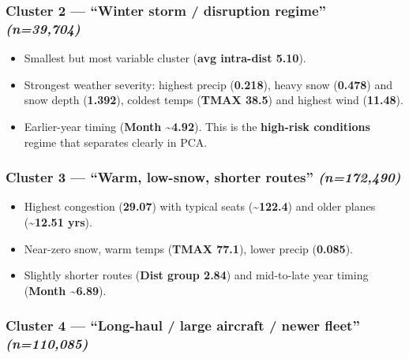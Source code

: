 \documentclass[11pt]{article}
\providecommand{\tightlist}{%
      \setlength{\itemsep}{0pt}\setlength{\parskip}{0pt}}
\begin{document}
\subsubsection{\texorpdfstring{Cluster 2 --- ``Winter storm / disruption
regime''
\emph{(n=39,704)}}{Cluster 2 --- ``Winter storm / disruption regime'' (n=39,704)}}\label{cluster-2-winter-storm-disruption-regime-n39704}

\begin{itemize}
\tightlist
\item
  Smallest but most variable cluster (\textbf{avg intra-dist 5.10}).
\item
  Strongest weather severity: highest precip (\textbf{0.218}), heavy
  snow (\textbf{0.478}) and snow depth (\textbf{1.392}), coldest temps
  (\textbf{TMAX 38.5}) and highest wind (\textbf{11.48}).
\item
  Earlier-year timing (\textbf{Month \textasciitilde4.92}). This is the
  \textbf{high-risk conditions} regime that separates clearly in PCA.
\end{itemize}

\subsubsection{\texorpdfstring{Cluster 3 --- ``Warm, low-snow, shorter
routes''
\emph{(n=172,490)}}{Cluster 3 --- ``Warm, low-snow, shorter routes'' (n=172,490)}}\label{cluster-3-warm-low-snow-shorter-routes-n172490}

\begin{itemize}
\tightlist
\item
  Highest congestion (\textbf{29.07}) with typical seats
  (\textbf{\textasciitilde122.4}) and older planes
  (\textbf{\textasciitilde12.51 yrs}).
\item
  Near-zero snow, warm temps (\textbf{TMAX 77.1}), lower precip
  (\textbf{0.085}).
\item
  Slightly shorter routes (\textbf{Dist group 2.84}) and mid-to-late
  year timing (\textbf{Month \textasciitilde6.89}).
\end{itemize}

\subsubsection{\texorpdfstring{Cluster 4 --- ``Long-haul / large
aircraft / newer fleet''
\emph{(n=110,085)}}{Cluster 4 --- ``Long-haul / large aircraft / newer fleet'' (n=110,085)}}\label{cluster-4-long-haul-large-aircraft-newer-fleet-n110085}
\end{document}

